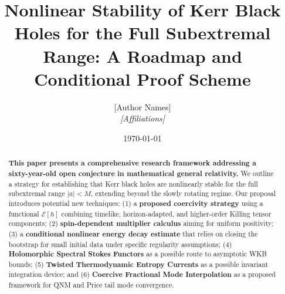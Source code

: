 \documentclass[12pt,a4paper]{article}
\title{\textbf{Nonlinear Stability of Kerr Black Holes for the Full Subextremal Range: A Roadmap and Conditional Proof Scheme}}
\author{[Author Names]\\
\textit{[Affiliations]}}
\date{\today}
\begin{document}
\maketitle

\begin{abstract}
\textbf{This paper presents a comprehensive research framework addressing a sixty-year-old open conjecture in mathematical general relativity.} We outline a strategy for establishing that Kerr black holes are nonlinearly stable for the full subextremal range $|a| < M$, extending beyond the slowly rotating regime. Our proposal introduces potential new techniques: (1) a \textbf{proposed coercivity strategy} using a functional $\mathcal{E}[h]$ combining timelike, horizon-adapted, and higher-order Killing tensor components; (2) \textbf{spin-dependent multiplier calculus} aiming for uniform positivity; (3) a \textbf{conditional nonlinear energy decay estimate} that relies on closing the bootstrap for small initial data under specific regularity assumptions; (4) \textbf{Holomorphic Spectral Stokes Functors} as a possible route to asymptotic WKB bounds; (5) \textbf{Twisted Thermodynamic Entropy Currents} as a possible invariant integration device; and (6) \textbf{Coercive Fractional Mode Interpolation} as a proposed framework for QNM and Price tail mode convergence.
\end{abstract}

\vspace{1em}
\noindent{}
\vspace{1em}

\tableofcontents

\newpage
\end{document}

